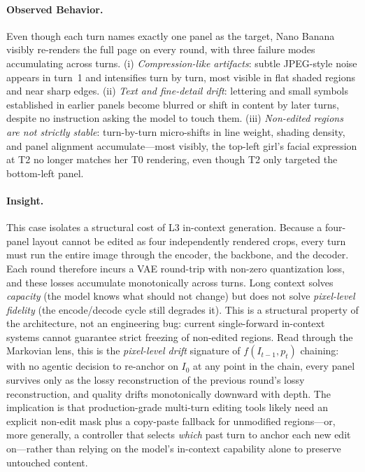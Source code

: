 \documentclass{llmxive}
\begin{document}
\paragraph{Observed Behavior.}
Even though each turn names exactly one panel as the target, Nano Banana visibly re-renders the full page on every round, with three failure modes accumulating across turns. (i) \emph{Compression-like artifacts}: subtle JPEG-style noise appears in turn~1 and intensifies turn by turn, most visible in flat shaded regions and near sharp edges. (ii) \emph{Text and fine-detail drift}: lettering and small symbols established in earlier panels become blurred or shift in content by later turns, despite no instruction asking the model to touch them. (iii) \emph{Non-edited regions are not strictly stable}: turn-by-turn micro-shifts in line weight, shading density, and panel alignment accumulate---most visibly, the top-left girl's facial expression at T2 no longer matches her T0 rendering, even though T2 only targeted the bottom-left panel.

\paragraph{Insight.}
This case isolates a structural cost of L3 in-context generation. Because a four-panel layout cannot be edited as four independently rendered crops, every turn must run the entire image through the encoder, the backbone, and the decoder. Each round therefore incurs a VAE round-trip with non-zero quantization loss, and these losses accumulate monotonically across turns. Long context solves \emph{capacity} (the model knows what should not change) but does not solve \emph{pixel-level fidelity} (the encode/decode cycle still degrades it). This is a structural property of the architecture, not an engineering bug: current single-forward in-context systems cannot guarantee strict freezing of non-edited regions. Read through the Markovian lens, this is the \emph{pixel-level drift} signature of $f(I_{t-1}, p_t)$ chaining: with no agentic decision to re-anchor on $I_0$ at any point in the chain, every panel survives only as the lossy reconstruction of the previous round's lossy reconstruction, and quality drifts monotonically downward with depth. The implication is that production-grade multi-turn editing tools likely need an explicit non-edit mask plus a copy-paste fallback for unmodified regions---or, more generally, a controller that selects \emph{which} past turn to anchor each new edit on---rather than relying on the model's in-context capability alone to preserve untouched content.
\end{document}

